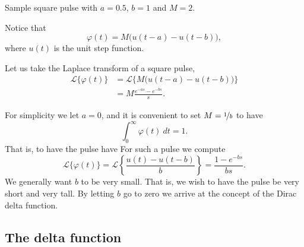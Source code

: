 \begin{mywrapfig}[15]{3.25in}
\capstart
{}
\caption{Sample square pulse with $a=0.5$, $b=1$ and $M = 2$.\label{lt:sqpulse}}
\end{mywrapfig}

Notice that
\begin{equation*}
\varphi(t) = M \bigl( u(t-a) - u(t-b) \bigr) ,
\end{equation*}
where $u(t)$ is the unit step function.

Let us take the Laplace transform of a square pulse,
\begin{equation*}
\begin{split}
{\mathcal{L}} \bigl\{ \varphi(t) \bigr\}
& =
{\mathcal{L}} \bigl\{ M \bigl( u(t-a) - u(t-b) \bigr)  \bigr\}
\\
& =
M
\frac{e^{-as} - e^{-bs}}{s} .
\end{split}
\end{equation*}

For simplicity we let $a=0$, and it is convenient
to set $M = \nicefrac{1}{b}$ to have
\begin{equation*}
\int_0^\infty \varphi(t) ~dt = 1 .
\end{equation*}
That is, to have the pulse have 
For such a pulse we
compute
\begin{equation*}
{\mathcal{L}} \bigl\{ \varphi(t) \bigr\}
=
{\mathcal{L}} \left\{ \frac{u(t) - u(t-b)}{b}  \right\}
=
\frac{1 - e^{-bs}}{bs} .
\end{equation*}
We generally want $b$ to be very small.  That is, we wish to have
the pulse be very short and very tall.  By letting $b$ go to zero we arrive
at the concept of the Dirac delta function.

\subsection{The delta function}

